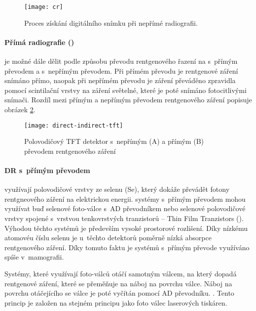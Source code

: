 \begin{figure}[ht]
\centering
\texttt{[image: cr]}
\caption{Proces získání digitálního snímku při nepřímé radiografii. \cite[str.~677]{Advances-in-Digital-Radiography}}
\label{fig:cr}
\end{figure}

\paragraph{Přímá radiografie ()}
 je možné dále dělit podle způsobu převodu rentgenového řazení na  s~přímým  převodem a  s~nepřímým převodem. Při přímém převodu je rentgenové záření snímáno přímo, naopak při nepřímém převodu je záření převáděno zpravidla pomocí scintilační vrstvy na záření světelné, které je poté snímáno fotocitlivými snímači. Rozdíl mezi přímým a nepřímým převodem rentgenového záření popisuje obrázek \cref{fig:direct-indirect-tft}.

\begin{figure}[ht]
\centering
\texttt{[image: direct-indirect-tft]}
\caption{Polovodičový TFT detektor s~nepřímým (A) a přímým (B) převodem rentgenového záření \cite[str.~511]{Radiation-Detection-and-Measurement}}
\label{fig:direct-indirect-tft}
\end{figure}

\paragraph{DR s~přímým převodem}
využívají polovodičové vrstvy ze selenu (Se), který dokáže převádět fotony rentgneového záření na elektrickou energii.  systémy s~přímým převodem mohou využívat buď selenové foto-válce s~AD převodníkem nebo selenové polovodičové vrstvy spojené s~vrstvou tenkovrstvých tranzistorů -- Thin Film Tranzistors (). \cite[str.~678]{Advances-in-Digital-Radiography} Výhodou těchto systémů je především vysoké prostorové rozlišení. Díky nízkému atomovéu číslu selenu je u~těchto detektorů poměrně nízká absorpce rentgenového záření. Díky tomuto faktu je systémů s~přímým převode využíváno spíše v~mamografii. \cite[str~210]{Diagnostic-Radiology}

Systémy, které využívají foto-válců otáčí samotným válcem, na který dopadá rentgenové záření, které se přeměňuje na náboj na povrchu válce. Náboj na povrchu otáčejícího se válce je poté vyčítán pomocí AD převodníku. \cite[str.~677]{Advances-in-Digital-Radiography}. Tento princip je založen na stejném principu jako foto válec laserových tiskáren.
 
